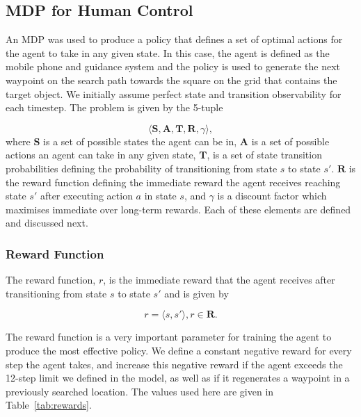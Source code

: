 \documentclass[a4paper, twoside]{article}
\begin{document}
\subsection{MDP for Human Control}

\noindent An MDP was used to produce a policy that defines a set of optimal actions for the agent to take in any given state. In this case, the agent is defined as the mobile phone and guidance system and the policy is used to generate the next waypoint on the search path towards the square on the grid that contains the target object. We initially assume perfect state and transition observability for each timestep. The problem is given by the 5-tuple

\begin{equation}
  \langle{}\mathbf{S}, \mathbf{A}, \mathbf{T}, \mathbf{R}, \gamma\rangle, 
\end{equation}
where $\mathbf{S}$ is a set of possible states the agent can be in, $\mathbf{A}$ is a set of possible actions an agent can take in any given state, $\mathbf{T}$, is a set of state transition probabilities defining the probability of transitioning from state $s$ to state $s'$. $\mathbf{R}$ is the reward function defining the immediate reward the agent receives reaching state $s'$ after executing action $a$ in state $s$, and $\gamma$ is a discount factor which maximises immediate over long-term rewards. Each of these elements are defined and discussed next.

\subsubsection{Reward Function}

\noindent The reward function, $r$, is the immediate reward that the agent receives after transitioning from state $s$ to state $s'$ and is given by 

\begin{equation}
  r = \langle{}s, s'\rangle, r\in{}\mathbf{R}.
\end{equation} 

The reward function is a very important parameter for training the agent to produce the most effective policy. We define a constant negative reward for every step the agent takes, and increase this negative reward if the agent exceeds the 12-step limit we defined in the model, as well as if it regenerates a waypoint in a previously searched location. The values used here are given in Table~\ref{tab:rewards}.
\end{document}
